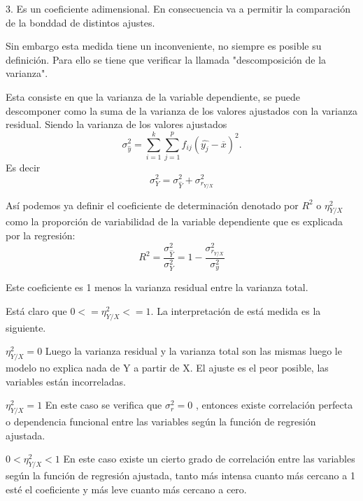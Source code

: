 \documentclass{article}
\begin{document}
	\vspace{2mm}
	
	3. Es un coeficiente adimensional. En consecuencia va a permitir la comparación de la bonddad de distintos ajustes.
	
	\vspace{2mm}
	
	Sin embargo esta medida tiene un inconveniente, no siempre es posible su definición. Para ello se tiene que verificar la llamada "descomposición de la varianza".
	
	\vspace{2mm}
	
	Esta consiste en que la varianza de la variable dependiente, se puede descomponer como la suma de la varianza de los valores ajustados con la varianza residual. Siendo la varianza de los valores ajustados $$\sigma_{\hat{y}}^2 = \sum_{i=1}^k \sum_{j=1}^p f_{ij} (\hat{y_j} - \overline{x} )^2. $$
Es decir
	$$ \sigma_Y^2 = \sigma_{\hat{Y}}^2 + \sigma_{r_{Y/X}}^2 $$
	
	
	Así podemos ya definir el coeficiente de determinación denotado por $R^2$ o $\eta_{Y/X}^2$ como la proporción de variabilidad de la variable dependiente que es explicada por la regresión: $$R^2 = \frac{\sigma_{\hat{Y}}^2}{\sigma_Y^2}  = 1 - \frac{\sigma_{r_{Y/X}}^2}{\sigma_y^2}$$
	
	Este coeficiente es 1 menos la varianza residual entre la varianza total.
	
	Está claro que $ 0 <= \eta_{Y/X}^2  <= 1 $. La interpretación de está medida es la siguiente.
	
\vspace{2mm}	
	
	$ \eta_{Y/X}^2 = 0 $ Luego la varianza residual y la varianza total son las mismas luego le modelo no explica nada de Y a partir de X. El ajuste es el peor posible, las variables están incorreladas.
	
\vspace{2mm}	
	
	$ \eta_{Y/X}^2 = 1 $ En este caso se verifica que $\sigma_r^2 = 0$ , entonces existe correlación perfecta o dependencia funcional entre las variables según la función de regresión ajustada.	
	
\vspace{2mm}	
	
	$ 0 < \eta_{Y/X}^2 < 1 $  En este caso existe un cierto grado de correlación entre las variables según la función de regresión ajustada, tanto más intensa cuanto más cercano a 1 esté el coeficiente y más leve cuanto más cercano a cero.
	
\end{document}

